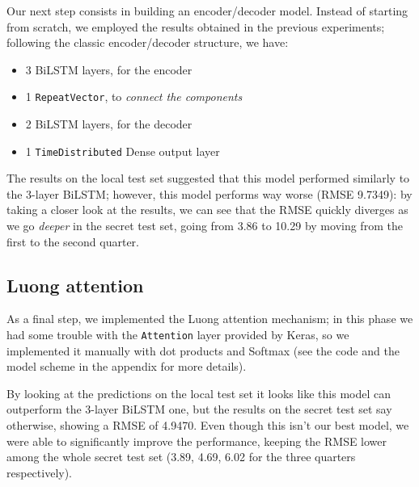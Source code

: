 \documentclass[10.5pt,a4paper,twocolumn]{article}
\begin{document}
Our next step consists in building an encoder/decoder model. Instead of starting from 
scratch, we employed the results obtained in the previous experiments; following the
classic encoder/decoder structure, we have:
\begin{itemize}
    \item 3 BiLSTM layers, for the encoder
    \item 1 \texttt{RepeatVector}, to \textit{connect the components}
    \item 2 BiLSTM layers, for the decoder
    \item 1 \texttt{TimeDistributed} Dense output layer
\end{itemize}

The results on the local test set suggested that this model performed similarly to the 
3-layer BiLSTM; however, this model performs way worse (RMSE 9.7349): by taking a closer look
at the results, we can see that the RMSE quickly diverges as we go \textit{deeper} in the
secret test set, going from 3.86 to 10.29 by moving from the first to the second quarter.

\subsection{Luong attention}
As a final step, we implemented the Luong attention mechanism; in this phase we had
some trouble with the \texttt{Attention} layer provided by Keras, so we implemented
it manually with dot products and Softmax (see the code and the model scheme in the appendix for more details).

By looking at the predictions on the local test set it looks like this model can outperform the 3-layer BiLSTM one,
but the results on the secret test set say otherwise, showing a RMSE of 4.9470. Even though this isn't our best model,
we were able to significantly improve the performance, keeping the RMSE lower among the whole secret test set 
(3.89, 4.69, 6.02 for the three quarters respectively).
\end{document}
